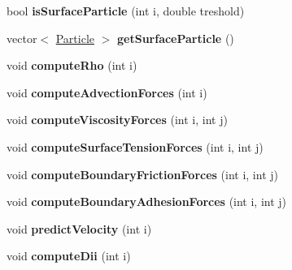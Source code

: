 \begin{DoxyCompactItemize}
\item 
\hypertarget{classhokusai_1_1System_aa94aef91ba4304cb095df38001ea6a87}{bool {\bfseries is\+Surface\+Particle} (int i, double treshold)}\label{classhokusai_1_1System_aa94aef91ba4304cb095df38001ea6a87}

\item 
\hypertarget{classhokusai_1_1System_a36ea9ad4d239a3b2d9ca212f096e024c}{vector$<$ \hyperlink{classhokusai_1_1Particle}{Particle} $>$ {\bfseries get\+Surface\+Particle} ()}\label{classhokusai_1_1System_a36ea9ad4d239a3b2d9ca212f096e024c}

\item 
\hypertarget{classhokusai_1_1System_ababeb259a66d4c8860a907bf37b0daac}{void {\bfseries compute\+Rho} (int i)}\label{classhokusai_1_1System_ababeb259a66d4c8860a907bf37b0daac}

\item 
\hypertarget{classhokusai_1_1System_ab5698c6c009cf3f53d7fd7ea83124943}{void {\bfseries compute\+Advection\+Forces} (int i)}\label{classhokusai_1_1System_ab5698c6c009cf3f53d7fd7ea83124943}

\item 
\hypertarget{classhokusai_1_1System_a99dc5437815b3b06d839f8c14a6f5082}{void {\bfseries compute\+Viscosity\+Forces} (int i, int j)}\label{classhokusai_1_1System_a99dc5437815b3b06d839f8c14a6f5082}

\item 
\hypertarget{classhokusai_1_1System_a2e346ab27cf2975cfa722de07f6be13b}{void {\bfseries compute\+Surface\+Tension\+Forces} (int i, int j)}\label{classhokusai_1_1System_a2e346ab27cf2975cfa722de07f6be13b}

\item 
\hypertarget{classhokusai_1_1System_a96cafd0c6ed280d14a5274521c2a0ea8}{void {\bfseries compute\+Boundary\+Friction\+Forces} (int i, int j)}\label{classhokusai_1_1System_a96cafd0c6ed280d14a5274521c2a0ea8}

\item 
\hypertarget{classhokusai_1_1System_aef6475d83f8281dd994290a1a8e35f73}{void {\bfseries compute\+Boundary\+Adhesion\+Forces} (int i, int j)}\label{classhokusai_1_1System_aef6475d83f8281dd994290a1a8e35f73}

\item 
\hypertarget{classhokusai_1_1System_ac4a46ec961ba687f0cf9d6e7c3ca2fa7}{void {\bfseries predict\+Velocity} (int i)}\label{classhokusai_1_1System_ac4a46ec961ba687f0cf9d6e7c3ca2fa7}

\item 
\hypertarget{classhokusai_1_1System_a270f28102086bbb8eb329bace876cfa3}{void {\bfseries compute\+Dii} (int i)}\label{classhokusai_1_1System_a270f28102086bbb8eb329bace876cfa3}


\end{DoxyCompactItemize}
